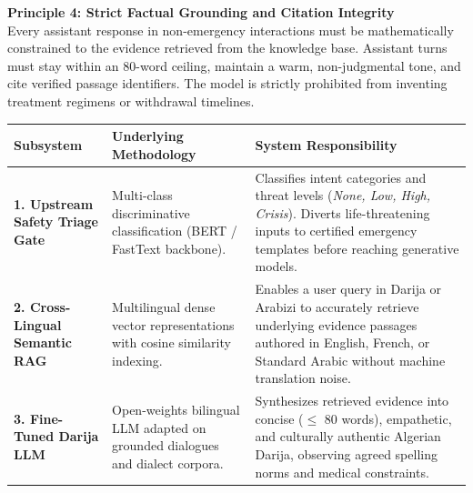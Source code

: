 \documentclass[10pt,a4paper]{article}
\begin{document}
\vspace{1.5mm}

\begin{tcolorbox}[colback=subtlegreen!50, colframe=forestgreen!60, boxrule=0.6pt, arc=3pt, left=10pt, right=10pt, top=6pt, bottom=6pt]
\textbf{\color{forestgreen} Principle 4: Strict Factual Grounding and Citation Integrity}\\
\footnotesize Every assistant response in non-emergency interactions must be mathematically constrained to the evidence retrieved from the knowledge base. Assistant turns must stay within an 80-word ceiling, maintain a warm, non-judgmental tone, and cite verified passage identifiers. The model is strictly prohibited from inventing treatment regimens or withdrawal timelines.
\end{tcolorbox}

\vspace{3mm}
\vspace{1.5mm}

\noindent\begin{tabularx}{\textwidth}{p{3.8cm}p{4.6cm}X}
\toprule
\textbf{Subsystem} & \textbf{Underlying Methodology} & \textbf{System Responsibility} \\
\midrule
\textbf{1. Upstream Safety Triage Gate} & Multi-class discriminative classification (BERT / FastText backbone). & Classifies intent categories and threat levels (\textit{None, Low, High, Crisis}). Diverts life-threatening inputs to certified emergency templates before reaching generative models. \\
\addlinespace[1.5mm]
\textbf{2. Cross-Lingual Semantic RAG} & Multilingual dense vector representations with cosine similarity indexing. & Enables a user query in Darija or Arabizi to accurately retrieve underlying evidence passages authored in English, French, or Standard Arabic without machine translation noise. \\
\addlinespace[1.5mm]
\textbf{3. Fine-Tuned Darija LLM} & Open-weights bilingual LLM adapted on grounded dialogues and dialect corpora. & Synthesizes retrieved evidence into concise ($\le$ 80 words), empathetic, and culturally authentic Algerian Darija, observing agreed spelling norms and medical constraints. \\
\bottomrule
\end{tabularx}
\end{document}
